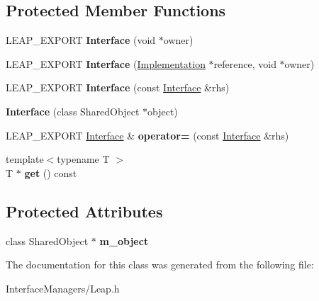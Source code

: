 \subsection*{Protected Member Functions}
\begin{DoxyCompactItemize}
\item 
\hypertarget{class_leap_1_1_interface_ac3a173f44d98821f915ae5a873c478dc}{L\+E\+A\+P\+\_\+\+E\+X\+P\+O\+R\+T {\bfseries Interface} (void $\ast$owner)}\label{class_leap_1_1_interface_ac3a173f44d98821f915ae5a873c478dc}

\item 
\hypertarget{class_leap_1_1_interface_a0e76882987c7866e17856c699b2490a8}{L\+E\+A\+P\+\_\+\+E\+X\+P\+O\+R\+T {\bfseries Interface} (\hyperlink{struct_leap_1_1_interface_1_1_implementation}{Implementation} $\ast$reference, void $\ast$owner)}\label{class_leap_1_1_interface_a0e76882987c7866e17856c699b2490a8}

\item 
\hypertarget{class_leap_1_1_interface_a540323027de8d874d86f4ad09f5b7103}{L\+E\+A\+P\+\_\+\+E\+X\+P\+O\+R\+T {\bfseries Interface} (const \hyperlink{class_leap_1_1_interface}{Interface} \&rhs)}\label{class_leap_1_1_interface_a540323027de8d874d86f4ad09f5b7103}

\item 
\hypertarget{class_leap_1_1_interface_a48b7660b77d962b30fa397919901967b}{{\bfseries Interface} (class Shared\+Object $\ast$object)}\label{class_leap_1_1_interface_a48b7660b77d962b30fa397919901967b}

\item 
\hypertarget{class_leap_1_1_interface_a763c07d957f412613423acf2c9830275}{L\+E\+A\+P\+\_\+\+E\+X\+P\+O\+R\+T \hyperlink{class_leap_1_1_interface}{Interface} \& {\bfseries operator=} (const \hyperlink{class_leap_1_1_interface}{Interface} \&rhs)}\label{class_leap_1_1_interface_a763c07d957f412613423acf2c9830275}

\item 
\hypertarget{class_leap_1_1_interface_af5e59f158a1738b37b64d5161fad550a}{{\footnotesize template$<$typename T $>$ }\\T $\ast$ {\bfseries get} () const }\label{class_leap_1_1_interface_af5e59f158a1738b37b64d5161fad550a}

\end{DoxyCompactItemize}
\subsection*{Protected Attributes}
\begin{DoxyCompactItemize}
\item 
\hypertarget{class_leap_1_1_interface_aebf4e096301998b829239acd895b387c}{class Shared\+Object $\ast$ {\bfseries m\+\_\+object}}\label{class_leap_1_1_interface_aebf4e096301998b829239acd895b387c}

\end{DoxyCompactItemize}


The documentation for this class was generated from the following file\+:\begin{DoxyCompactItemize}
\item 
Interface\+Managers/Leap.\+h\end{DoxyCompactItemize}
